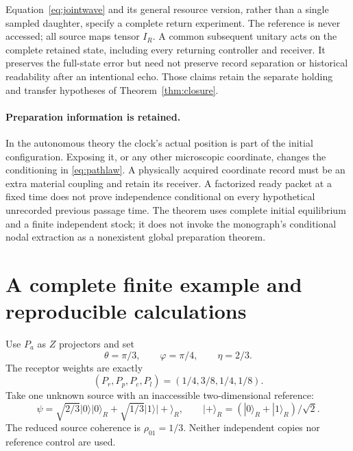\documentclass[11pt]{article}
\theoremstyle{definition}\newtheorem{assumption}[theorem]{Constitutive assumption}
\theoremstyle{remark}\newtheorem{remark}[theorem]{Remark}
\newcommand{\ket}[1]{|#1\rangle}\newcommand{\bra}[1]{\langle#1|}
\begin{document}
Equation~\eqref{eq:jointwave} and its general resource version, rather than a single sampled daughter, specify a complete return experiment. The reference is never accessed; all source maps tensor $I_R$. A common subsequent unitary acts on the complete retained state, including every returning controller and receiver. It preserves the full-state error but need not preserve record separation or historical readability after an intentional echo. Those claims retain the separate holding and transfer hypotheses of Theorem~\ref{thm:closure}.

\paragraph{Preparation information is retained.}
In the autonomous theory the clock's actual position is part of the initial configuration. Exposing it, or any other microscopic coordinate, changes the conditioning in \eqref{eq:pathlaw}. A physically acquired coordinate record must be an extra material coupling and retain its receiver. A factorized ready packet at a fixed time does not prove independence conditional on every hypothetical unrecorded previous passage time. The theorem uses complete initial equilibrium and a finite independent stock; it does not invoke the monograph's conditional nodal extraction as a nonexistent global preparation theorem.

\section{A complete finite example and reproducible calculations}
\label{sec:example}
Use $P_a$ as $Z$ projectors and set
\[
 \theta=\pi/3,\qquad\varphi=\pi/4,\qquad\eta=2/3.
\]
The receptor weights are exactly
\begin{equation}\label{eq:exampleweights}
 (P_r,P_p,P_c,P_l)=(1/4,3/8,1/4,1/8).
\end{equation}
Take one unknown source with an inaccessible two-dimensional reference:
\begin{equation}\label{eq:inputexample}
 \psi=\sqrt{2/3}\ket0\ket0_R+
                       \sqrt{1/3}\ket1\ket+_R,\qquad
 \ket+_R=(\ket0_R+\ket1_R)/\sqrt2.
\end{equation}
The reduced source coherence is $\rho_{01}=1/3$. Neither independent copies nor reference control are used.
\end{document}
